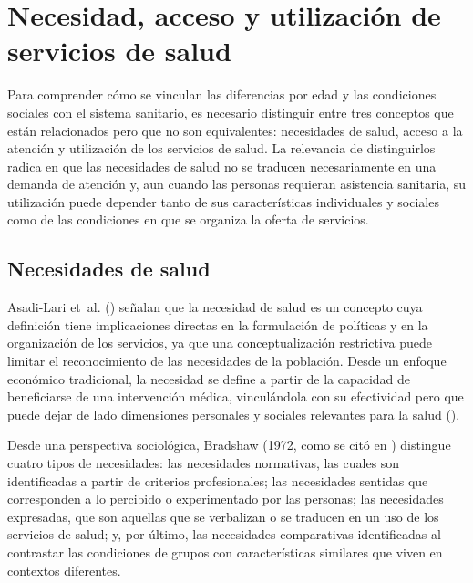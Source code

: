 \documentclass[
  spanish,
  a4paper,
  oneside]{scrbook}
\begin{document}
\section{Necesidad, acceso y utilización de servicios de
salud}\label{necesidad-acceso-y-utilizaciuxf3n-de-servicios-de-salud}

Para comprender cómo se vinculan las diferencias por edad y las
condiciones sociales con el sistema sanitario, es necesario distinguir
entre tres conceptos que están relacionados pero que no son
equivalentes: necesidades de salud, acceso a la atención y utilización
de los servicios de salud. La relevancia de distinguirlos radica en que
las necesidades de salud no se traducen necesariamente en una demanda de
atención y, aun cuando las personas requieran asistencia sanitaria, su
utilización puede depender tanto de sus características individuales y
sociales como de las condiciones en que se organiza la oferta de
servicios.

\subsection{Necesidades de salud}\label{necesidades-de-salud}

Asadi-Lari et~al. () señalan
que la necesidad de salud es un concepto cuya definición tiene
implicaciones directas en la formulación de políticas y en la
organización de los servicios, ya que una conceptualización restrictiva
puede limitar el reconocimiento de las necesidades de la población.
Desde un enfoque económico tradicional, la necesidad se define a partir
de la capacidad de beneficiarse de una intervención médica, vinculándola
con su efectividad pero que puede dejar de lado dimensiones personales y
sociales relevantes para la salud
().

Desde una perspectiva sociológica, Bradshaw (1972, como se citó en
) distingue
cuatro tipos de necesidades: las necesidades normativas, las cuales son
identificadas a partir de criterios profesionales; las necesidades
sentidas que corresponden a lo percibido o experimentado por las
personas; las necesidades expresadas, que son aquellas que se verbalizan
o se traducen en un uso de los servicios de salud; y, por último, las
necesidades comparativas identificadas al contrastar las condiciones de
grupos con características similares que viven en contextos diferentes.
\end{document}
